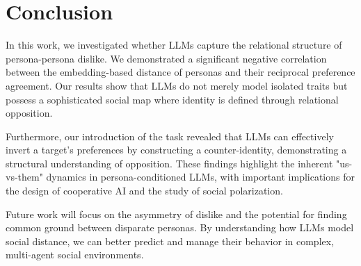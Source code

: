\section{Conclusion}

In this work, we investigated whether LLMs capture the relational structure of persona-persona dislike. We demonstrated a significant negative correlation between the embedding-based distance of personas and their reciprocal preference agreement. Our results show that LLMs do not merely model isolated traits but possess a sophisticated social map where identity is defined through relational opposition. 

Furthermore, our introduction of the \schismogenesis task revealed that LLMs can effectively invert a target's preferences by constructing a counter-identity, demonstrating a structural understanding of opposition. These findings highlight the inherent "us-vs-them" dynamics in persona-conditioned LLMs, with important implications for the design of cooperative AI and the study of social polarization.

Future work will focus on the asymmetry of dislike and the potential for finding common ground between disparate personas. By understanding how LLMs model social distance, we can better predict and manage their behavior in complex, multi-agent social environments.
